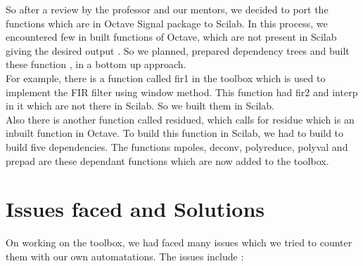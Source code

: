 \documentclass[12pt,a4paper]{report}
\begin{document}
So after a review by the professor and our mentors, we decided to port the functions which are in Octave Signal package to Scilab\cite{oct}. In this process, we encountered few in built functions of Octave, which are not present in Scilab giving the desired output . So we planned, prepared dependency trees and built these function , in a bottom up approach.\\

For example, there is a function called fir1 in the toolbox which is used to implement the FIR filter using window method. This function had fir2 and interp in it which are not there in Scilab. So we built them in Scilab.\\
Also there is another function called residued, which calls for residue which is an inbuilt function in Octave. To build this function in Scilab, we had to build to build five dependencies. The functions mpoles, deconv, polyreduce, polyval and prepad are these dependant functions which are now added to the toolbox.



\chapter{\textbf{Issues faced and Solutions}}
On working on the toolbox, we had faced many issues which we tried to counter them with our own automatations. The issues include :\\
\end{document}
